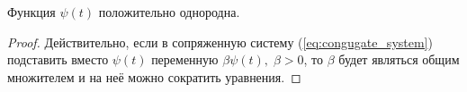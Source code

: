 \begin{assertion}
        Функция $\psi(t)$ положительно однородна.
\end{assertion}
\begin{proof}
        Действительно, если в сопряженную систему (\ref{eq:congugate_system}) подставить вместо  $\psi(t)$ переменную $\beta\psi(t),\; \beta > 0$, то $\beta$ будет являться общим множителем и на неё можно сократить уравнения.
\end{proof}
